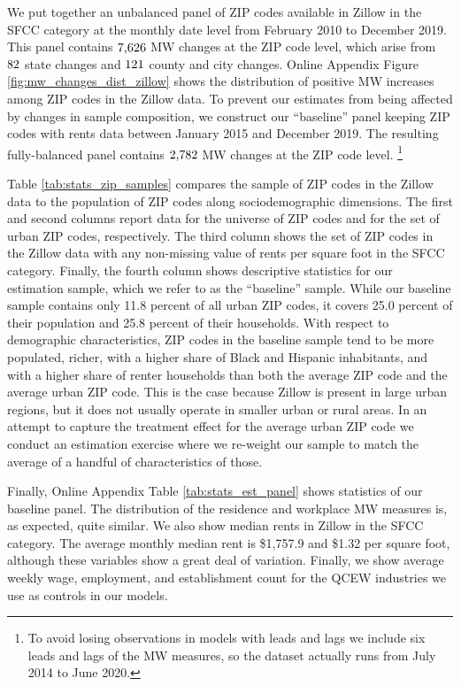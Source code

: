 We put together an unbalanced panel of ZIP codes available in Zillow in the 
SFCC category at the monthly date level from February 2010 to December 2019.
This panel contains $\textnormal{7,626}$ MW changes at the ZIP code level, 
which arise from $\textnormal{82}$ state changes and 
$\textnormal{121}$ county and city changes.
Online Appendix Figure \ref{fig:mw_changes_dist_zillow} shows the distribution 
of positive MW increases among ZIP codes in the Zillow data.
To prevent our estimates from being affected by changes in sample composition,
we construct our ``baseline'' panel keeping ZIP codes with rents data 
between January 2015 and December 2019.
The resulting fully-balanced panel contains $\textnormal{2,782}$ MW changes at 
the ZIP code level.%
\footnote{To avoid losing observations in models with leads and lags we include 
    six leads and lags of the MW measures, so the dataset actually runs from 
    July 2014 to June 2020.}

Table \ref{tab:stats_zip_samples} compares the sample of ZIP codes in the Zillow
data to the population of ZIP codes along sociodemographic dimensions.
The first and second columns report data for the universe of ZIP codes and 
for the set of urban ZIP codes, respectively.
The third column shows the set of ZIP codes in the Zillow data with any 
non-missing value of rents per square foot in the SFCC category.
Finally, the fourth column shows descriptive statistics for our estimation 
sample, which we refer to as the ``baseline'' sample.
While our baseline sample contains only 11.8 percent of all urban ZIP codes, it 
covers 25.0 percent of their population and 25.8 percent of their households.
With respect to demographic characteristics, ZIP codes in the baseline sample 
tend to be more populated, richer, with a higher share of Black and Hispanic 
inhabitants, and with a higher share of renter households than both 
the average ZIP code and the average urban ZIP code.
This is the case because Zillow is present in large urban regions, 
but it does not usually operate in smaller urban or rural areas.
In an attempt to capture the treatment effect for the average urban ZIP code 
we conduct an estimation exercise where we re-weight our sample to match the 
average of a handful of characteristics of those.

Finally, Online Appendix Table \ref{tab:stats_est_panel} shows statistics 
of our baseline panel.
The distribution of the residence and workplace MW measures is, as expected,
quite similar.
We also show median rents in Zillow in the SFCC category.
The average monthly median rent is \$1,757.9 and \$1.32 per square foot, 
although these variables show a great deal of variation.
Finally, we show average weekly wage, employment, and establishment count 
for the QCEW industries we use as controls in our models.
